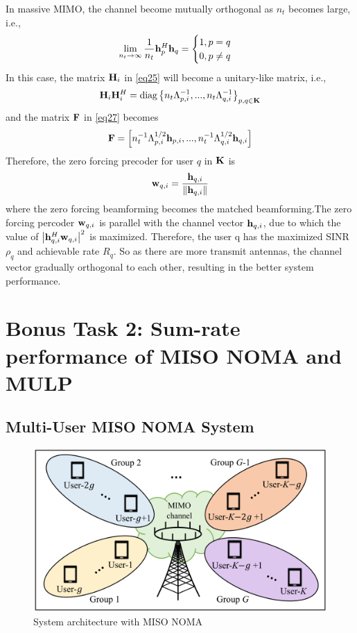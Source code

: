 \documentclass[10pt,conference]{IEEEtran}
\begin{document}
In massive MIMO, the channel become mutually orthogonal as $n_t$ becomes large, i.e.,
\begin{equation}
    \lim_{n_t \to \infty} \frac{1}{n_t} {\bf{h}}_p^H {\bf{h}}_q = \begin{cases}
        1, p=q\\
        0, p \neq q
    \end{cases}
\end{equation}
In this case, the matrix ${\bf{H}}_i$ in \eqref{eq25} will become a unitary-like matrix, i.e.,
\begin{equation}
    {\bf{H}}_i {\bf{H}}_i^H = \text{diag}\left\{ n_t \Lambda_{p,i}^{-1},...,n_t \Lambda_{q,i}^{-1} \right\}_{p, q \in \bf{K}}
\end{equation}
and the matrix $\bf{F}$ in \eqref{eq27} becomes
\begin{equation}
    {\bf{F}} = \left[ n_t^{-1} \Lambda_{p,i}^{1/2} {\bf{h}}_{p,i},...,n_t^{-1} \Lambda_{q,i}^{1/2} {\bf{h}}_{q,i} \right]
\end{equation}
Therefore, the zero forcing precoder for user $q$ in $\bf{K}$ is 
\begin{equation}
    {\bf{w}}_{q,i} = \frac{{\bf{h}}_{q,i}}{\left\Vert {\bf{h}}_{q,i} \right\Vert}
\end{equation}
where the zero forcing beamforming becomes the matched beamforming.The zero 
forcing percoder ${\bf{w}}_{q,i}$ is parallel with the channel 
vector ${\bf{h}}_{q,i}$, due to which the value of $\left| {\bf{h}}_{q,i}^H {\bf{w}}_{q,i} \right|^2$ 
is maximized. Therefore, the user q has the maximized SINR $\rho_q$ and achievable rate $R_q$.
So as there are more transmit antennas, the channel vector gradually orthogonal to each other,
resulting in the better system performance.


\section{Bonus Task 2: Sum-rate performance of MISO NOMA and MULP}

\subsection{Multi-User MISO NOMA System}

\begin{figure} [htb]
    \centering
    \includegraphics[width=1\linewidth]{Fig8.png}
    \caption{System architecture with MISO NOMA}
    \label{fig8}
\end{figure}
\end{document}
